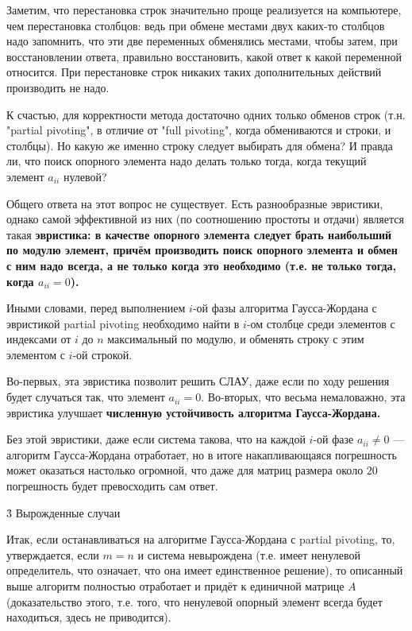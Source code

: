 Заметим, что перестановка строк значительно проще реализуется на компьютере, чем перестановка столбцов: ведь при обмене местами двух каких-то столбцов надо запомнить, что эти две переменных обменялись местами, чтобы затем, при восстановлении ответа, правильно восстановить, какой ответ к какой переменной относится. При перестановке строк никаких таких дополнительных действий производить не надо.

К счастью, для корректности метода достаточно одних только обменов строк (т.н. "partial pivoting", в отличие от "full pivoting", когда обмениваются и строки, и столбцы). Но какую же именно строку следует выбирать для обмена? И правда ли, что поиск опорного элемента надо делать только тогда, когда текущий элемент $a_{ii}$ нулевой?

Общего ответа на этот вопрос не существует. Есть разнообразные эвристики, однако самой эффективной из них (по соотношению простоты и отдачи) является такая \bf{эвристика}: в качестве опорного элемента следует брать наибольший по модулю элемент, причём производить поиск опорного элемента и обмен с ним надо \bf{всегда}, а не только когда это необходимо (т.е. не только тогда, когда $a_{ii}=0$).

Иными словами, перед выполнением $i$-ой фазы алгоритма Гаусса-Жордана с эвристикой partial pivoting необходимо найти в $i$-ом столбце среди элементов с индексами от $i$ до $n$ максимальный по модулю, и обменять строку с этим элементом с $i$-ой строкой.

Во-первых, эта эвристика позволит решить СЛАУ, даже если по ходу решения будет случаться так, что элемент $a_{ii}=0$. Во-вторых, что весьма немаловажно, эта эвристика улучшает \bf{численную устойчивость} алгоритма Гаусса-Жордана.

Без этой эвристики, даже если система такова, что на каждой $i$-ой фазе $a_{ii} \ne 0$ --- алгоритм Гаусса-Жордана отработает, но в итоге накапливающаяся погрешность может оказаться настолько огромной, что даже для матриц размера около $20$ погрешность будет превосходить сам ответ.


\h3{ Вырожденные случаи }

Итак, если останавливаться на алгоритме Гаусса-Жордана с partial pivoting, то, утверждается, если $m=n$ и система невырождена (т.е. имеет ненулевой определитель, что означает, что она имеет единственное решение), то описанный выше алгоритм полностью отработает и придёт к единичной матрице $A$ (доказательство этого, т.е. того, что ненулевой опорный элемент всегда будет находиться, здесь не приводится).

